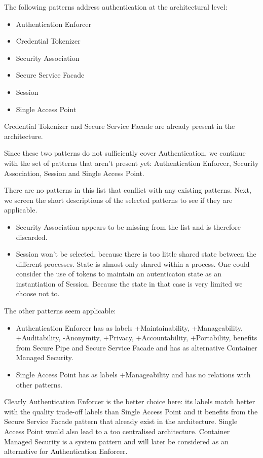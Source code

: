\documentclass[a4paper,11pt]{report}
\begin{document}
The following patterns address authentication at the architectural level:
\begin{itemize}
\item Authentication Enforcer
\item Credential Tokenizer
\item Security Association
\item Secure Service Facade
\item Session
\item Single Access Point
\end{itemize}

Credential Tokenizer and Secure Service Facade are already present in the architecture.

Since these two patterns do not sufficiently cover Authentication, we continue with the set of patterns that aren't
present yet: Authentication Enforcer, Security Association, Session and Single Access Point.

There are no patterns in this list that conflict with any existing patterns.
Next, we screen the short descriptions of the selected patterns to see if they are applicable.
\begin{itemize}
\item Security Association appears to be missing from the list and is therefore discarded.
\item Session won't be selected, because there is too little shared state between the different processes. State is almost only shared within a process. One could consider the use of tokens to maintain an autenticaton state as an instantiation of Session. Because the state in that case is very limited we choose not to.
\end{itemize}

The other patterns seem applicable:
\begin{itemize}
\item Authentication Enforcer has as labels +Maintainability, +Manageability, +Auditability, -Anonymity, +Privacy,
+Accountability, +Portability, benefits from Secure Pipe and Secure Service Facade and has as alternative
Container Managed Security.
\item Single Access Point has as labels +Manageability and has no relations with other patterns.
\end{itemize}

Clearly Authentication Enforcer is the better choice here: its labels match better with the quality trade-off labels
than Single Access Point and it benefits from the Secure Service Facade pattern that already exist in the architecture.
Single Access Point would also lead to a too centralised architecture. Container Managed Security is a system pattern and will later be considered as an alternative for Authentication Enforcer.
\end{document}
